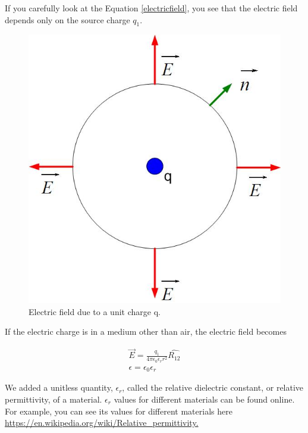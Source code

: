 \documentclass{ximera}
\begin{document}
If you carefully look at the Equation \ref{electricfield}, you see that the electric field depends only on the source charge $q_1$. 

\begin{figure}[htbp]
\begin{center}
\includegraphics[scale=0.5]{../jpg/unitchargefield.jpg}
\end{center}
\caption{Electric field due to a unit charge q.}
\label{UnitCh1}
\end{figure}

If the electric charge is in a medium other than air, the electric field becomes


\begin{eqnarray}
\vec{E}=\frac{q_1 }{4 \pi \epsilon_0 \epsilon_r r^2} \hat{R_{12}} \\
\epsilon = \epsilon_0 \epsilon_r
\end{eqnarray}\label{Coulombslaw3}

We added a unitless quantity, $\epsilon_r$, called the relative dielectric constant, or relative permittivity, of a material. $\epsilon_r$ values for different materials can be found online. For example, you can see its values for different materials here  \url{https://en.wikipedia.org/wiki/Relative_permittivity.}
\end{document}
